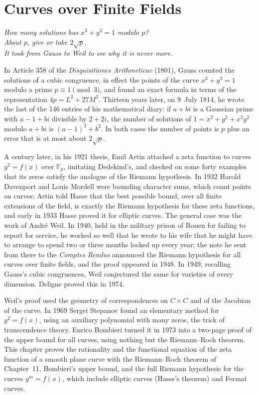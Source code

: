 \chapter{Curves over Finite Fields}
\begin{center}\itshape
How many solutions has $x^3+y^3=1$ modulo $p$?\\
About $p$, give or take $2\sqrt p$.\\
It took from Gauss to Weil to see why it is never more.
\end{center}

In Article 358 of the \emph{Disquisitiones Arithmeticae} (1801), Gauss counted the solutions of a cubic congruence, in effect the points of the
curve $x^3+y^3=1$ modulo a prime $p\equiv1\pmod3$, and found an exact formula in terms of the representation $4p=L^2+27M^2$. Thirteen years later, on
9~July 1814, he wrote the last of the 146 entries of his mathematical diary: if $a+bi$ is a Gaussian prime with $a-1+bi$ divisible by $2+2i$, the number of
solutions of $1=x^2+y^2+x^2y^2$ modulo $a+bi$ is $(a-1)^2+b^2$. In both cases the number of points is $p$ plus an error that is at most about $2\sqrt p$.

A century later, in his 1921 thesis, Emil Artin attached a zeta function to curves $y^2=f(x)$ over $\mathbb F_p$, imitating Dedekind's, and checked
on some forty examples that its zeros satisfy the analogue of the Riemann hypothesis. In 1932 Harold Davenport and Louis Mordell were bounding character
sums, which count points on curves; Artin told Hasse that the best possible bound, over all finite extensions of the field, is exactly the Riemann hypothesis for
these zeta functions, and early in 1933 Hasse proved it for elliptic curves. The general case was the work of Andr\'e Weil. In 1940, held in the military prison
of Rouen for failing to report for service, he worked so well that he wrote to his wife that he might have to arrange to spend two or three months locked
up every year; the note he sent from there to the \emph{Comptes Rendus} announced the Riemann hypothesis for all curves over finite fields, and the proof
appeared in 1948. In 1949, recalling Gauss's cubic congruences, Weil conjectured the same for varieties of every dimension. Deligne proved this in 1974.

Weil's proof used the geometry of correspondences on $C\times C$ and of the Jacobian of the curve. In 1969 Sergei Stepanov found an elementary method for $y^2=f(x)$, using an
auxiliary polynomial with many zeros, the trick of transcendence theory. Enrico Bombieri turned it in 1973 into a two-page proof of the upper bound for all
curves, using nothing but the Riemann--Roch theorem. This chapter proves the rationality and the functional equation of the zeta function of a smooth plane
curve with the Riemann--Roch theorem of Chapter~11, Bombieri's upper bound, and the full Riemann hypothesis for the curves $y^m=f(x)$, which include
elliptic curves (Hasse's theorem) and Fermat curves.

